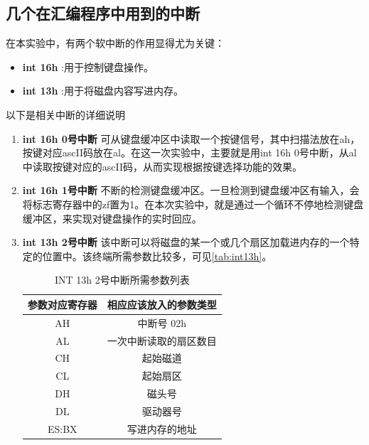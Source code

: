 \documentclass[forprint]{WHUBachelor}
\begin{document}
\subsection{几个在汇编程序中用到的中断}\label{sub:interrupt}

在本实验中，有两个软中断的作用显得尤为关键：

\begin{itemize}
  \item \textbf{int 16h} :用于控制键盘操作。
  \item \textbf{int 13h} :用于将磁盘内容写进内存。
\end{itemize}

以下是相关中断的详细说明

\begin{enumerate}

  \item \textbf{int 16h 0号中断} 可从键盘缓冲区中读取一个按键信号，其中扫描法放在ah，按键对应ascII码放在al。在这一次实验中，主要就是用int 16h 0号中断，从al中读取按键对应的ascII码，从而实现根据按键选择功能的效果。

  \item \textbf{int 16h 1号中断} 不断的检测键盘缓冲区。一旦检测到键盘缓冲区有输入，会将标志寄存器中的zf置为1。在本次实验中，就是通过一个循环不停地检测键盘缓冲区，来实现对键盘操作的实时回应。

  \item \textbf{int 13h 2号中断} 该中断可以将磁盘的某一个或几个扇区加载进内存的一个特定的位置中。该终端所需参数比较多，可见\autoref{tab:int13h}。

\begin{table}[htp]
  \caption{INT 13h 2号中断所需参数列表}
  \centering
  \begin{tabular}{cc}
    \toprule
    参数对应寄存器 & 相应应该放入的参数类型 \\
    \midrule
    AH & 中断号 02h \\     
    AL & 一次中断读取的扇区数目 \\
    CH &	起始磁道 \\
    CL &	起始扇区 \\
    DH &	磁头号 \\
    DL &	驱动器号 \\
    ES:BX & 写进内存的地址 \\	    
    \bottomrule
  \end{tabular}
  \label{tab:int13h}
\end{table}


\end{enumerate}
\end{document}
